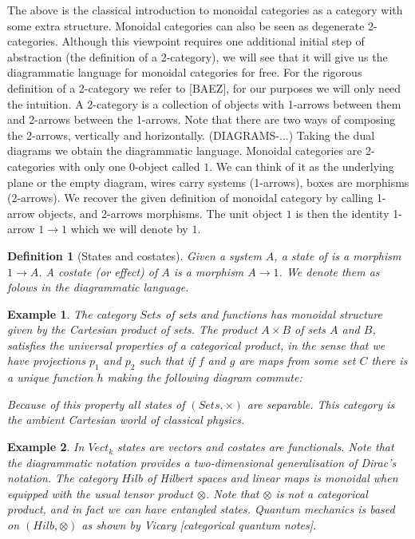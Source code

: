 \documentclass{article}
\newtheorem{definition}{Definition}
\newtheorem{example}{Example}
\begin{document}
The above is the classical introduction to monoidal categories as a category with some extra structure. Monoidal categories can also be seen as degenerate 2-categories. Although this viewpoint requires one additional initial step of abstraction (the definition of a 2-category), we will see that it will give us the diagrammatic language for monoidal categories for free. For the rigorous definition of a 2-category we refer to [BAEZ], for our purposes we will only need the intuition. A 2-category is a collection of objects with 1-arrows between them and 2-arrows between the 1-arrows. Note that there are two ways of composing the 2-arrows, vertically and horizontally. (DIAGRAMS-...) Taking the dual diagrams we obtain the diagrammatic language. Monoidal categories are 2-categories with only one 0-object called $1$. We can think of it as the underlying plane or the empty diagram, wires carry systems (1-arrows), boxes are morphisms (2-arrows). We recover the given definition of monoidal category by calling 1-arrow objects, and 2-arrows morphisms. The unit object $1$ is then the identity 1-arrow $1 \rightarrow 1$ which we will denote by $1$. 
\begin{definition}[States and costates]
Given a system $A$, a state of is a morphism $1 \rightarrow A$. A costate (or effect) of $A$ is a morphism $A \rightarrow 1$. We denote them as folows in the diagrammatic language.
\end{definition}
\begin{example}
The category $Sets$ of sets and functions has monoidal structure given by the Cartesian product of sets. The product $A \times B$ of sets $A$ and $B$, satisfies the universal properties of a categorical product, in the sense that we have projections $p_1$ and $p_2$ such that if $f$ and $g$ are maps from some set $C$ there is a unique function $h$ making the following diagram commute:
\begin{center}
\end{center}
Because of this property all states of $(Sets,\times)$ are separable. This category is the ambient Cartesian world of classical physics.
\end{example}
\begin{example}
In $Vect_k$ states are vectors and costates are functionals. Note that the diagrammatic notation provides a two-dimensional generalisation of Dirac's notation. The category $Hilb$ of Hilbert spaces and linear maps is monoidal when equipped with the usual tensor product $\otimes$. Note that $\otimes$ is not a categorical product, and in fact we can have entangled states. Quantum mechanics is based on $(Hilb, \otimes)$ as shown by Vicary [categorical quantum notes].
\end{example}
\end{document}
